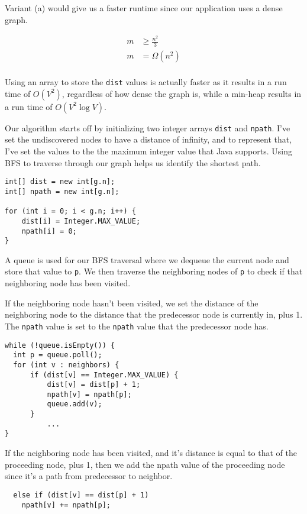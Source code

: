 \documentclass[11pt]{article}
\begin{document}
\medskip

Variant (a) would give us a faster runtime since our application uses a dense graph. 

\begin{align*}
m &\geq \frac{n^2}{3} \\
m &= \Omega{(n^2)} \\
\end{align*}

Using an array to store the \verb|dist| values is actually faster as it results in a run time of \(O(V^{2})\), regardless of how dense the graph is, while a min-heap results in a run time of \(O(V^{2}\log{V})\).

\newpage


Our algorithm starts off by initializing two integer arrays \verb|dist| and \verb|npath|. I've set the undiscovered nodes to have a distance of infinity, and to represent that, I've set the values to the the maximum integer value that Java supports. Using BFS to traverse through our graph helps us identify the shortest path.

\begin{lstlisting}
int[] dist = new int[g.n];
int[] npath = new int[g.n];

for (int i = 0; i < g.n; i++) {
    dist[i] = Integer.MAX_VALUE;
    npath[i] = 0;
}
\end{lstlisting}

A queue is used for our BFS traversal where we dequeue the current node and store that value to \verb|p|. We then traverse the neighboring nodes of \verb|p| to check if that neighboring node has been visited.

If the neighboring node hasn't been visited, we set the distance of the neighboring node to the distance that the predecessor node is currently in, plus 1. The \verb|npath| value is set to the \verb|npath| value that the predecessor node has.
\begin{lstlisting}
while (!queue.isEmpty()) {
  int p = queue.poll();
  for (int v : neighbors) {
      if (dist[v] == Integer.MAX_VALUE) {
          dist[v] = dist[p] + 1;
          npath[v] = npath[p];
          queue.add(v);
      }
          ...
}
\end{lstlisting}

If the neighboring node has been visited, and it's distance is equal to that of the proceeding node, plus 1, then we add the npath value of the proceeding node since it's a path from predecessor to neighbor.
\begin{lstlisting}
  else if (dist[v] == dist[p] + 1)
    npath[v] += npath[p];
\end{lstlisting}
\end{document}
